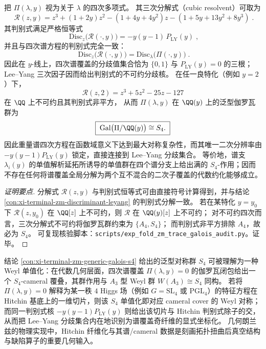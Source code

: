 \begin{conclusion}[谱的最大代数复杂度：\texorpdfstring{$\mathrm{Gal}_{\QQ(y)}\!\bigl(\Pi(\lambda,y)\bigr)\cong S_4$}{Gal(Q(y))(Pi)=S4}]\label{con:xi-terminal-zm-generic-galois-s4}
把 \(\Pi(\lambda,y)\) 视为关于 \(\lambda\) 的四次多项式。
其三次分解式（cubic resolvent）可取为
\[
\boxed{\;
\mathscr R(z,y)
=z^3+(1+2y)z^2-(1+4y+4y^2)z-(1+5y+13y^2+8y^3)\; }.
\]
其判别式满足严格恒等式
\[
\boxed{\;
\mathrm{Disc}_{z}\bigl(\mathscr R(\cdot,y)\bigr)
=-y(y-1)\,P_{\mathrm{LY}}(y)\; } ,
\]
并且与四次谱方程的判别式完全一致：
\[
\boxed{\;
\mathrm{Disc}_{z}\bigl(\mathscr R(\cdot,y)\bigr)
=\mathrm{Disc}_{\lambda}\bigl(\Pi(\cdot,y)\bigr)\; } .
\]
因此在 \(y\)-线上，四次谱覆盖的分歧值集合恰为 \(\{0,1\}\) 与 \(P_{\mathrm{LY}}(y)=0\) 的三根；Lee--Yang 三次因子因而给出判别式的不可约分歧核。
在任一良特化（例如 \(y=2\)）下，
\[
\mathscr R(z,2)=z^{3}+5z^{2}-25z-127
\]
在 \(\QQ\) 上不可约且其判别式非平方，
从而 \(\Pi(\lambda,y)\) 在 \(\QQ(y)\) 上的泛型伽罗瓦群为
\[
\boxed{\;\mathrm{Gal}\bigl(\Pi/\QQ(y)\bigr)\cong S_4.\;}
\]
因此重量谱四次方程在函数域意义下达到最大对称复杂性，而其唯一二次分辨率由 \(-y(y-1)P_{\mathrm{LY}}(y)\) 锁定，直接连接到 Lee--Yang 分歧集合。
等价地，谱支 \(\lambda_i(y)\) 的单值解析延拓所诱导的单值群在四个谱分支上给出满的 \(S_4\)-作用；因而不存在任何将谱覆盖全局分解为两个互不混合的二次子覆盖的代数约化能够成立。
\end{conclusion}
\begin{proof}[证明要点]
分解式 \(\mathscr R(z,y)\) 与判别式恒等式可由直接符号计算得到，并与结论 \ref{con:xi-terminal-zm-discriminant-leyang} 的判别式分解一致。
若在某特化 \(y=y_0\) 下 \(\mathscr R(z,y_0)\) 在 \(\QQ[z]\) 上不可约，则 \(\mathscr R\) 在 \(\QQ(y)[z]\) 上不可约；
对不可约四次而言，三次分解式不可约将伽罗瓦群约束为 \(\{A_4,S_4\}\)；
而判别式非平方排除 \(A_4\)，故必为 \(S_4\)。
可复现核验脚本：\texttt{scripts/exp\_fold\_zm\_trace\_galois\_audit.py}。证毕。
\end{proof}

\begin{remark}[Hitchin 谱覆盖与 \texorpdfstring{$A_3$}{A3} cameral 覆叠：\texorpdfstring{$S_4\simeq W(A_3)$}{S4=W(A3)} 的结构性解释]\label{rem:xi-terminal-zm-hitchin-cameral-cover}
结论 \ref{con:xi-terminal-zm-generic-galois-s4} 给出的泛型对称群 \(S_4\) 可被理解为一种 Weyl 单值化：在代数几何层面，四次谱覆盖 \(\Pi(\lambda,y)=0\) 的伽罗瓦闭包给出一个 \(S_4\)-cameral 覆叠，其群作用与 \(A_3\) 型 Weyl 群 \(W(A_3)\cong S_4\) 同构。
若将 \(\Pi(\lambda,y)=0\) 解释为某一秩 \(4\) Higgs 场（例如 \(G=\mathrm{SL}_4\) 或 \(\mathrm{PGL}_4\)）的特征方程在 Hitchin 基底上的一维切片，则该 \(S_4\) 单值化即对应 cameral cover 的 Weyl 对称；
而同一判别式核 \(-y(y-1)P_{\mathrm{LY}}(y)\) 则给出该切片与 Hitchin 判别式除子的交，从而把 Lee--Yang 分歧集合内在地识别为谱覆盖奇纤维的显式坐标化。
几何朗兰兹的物理实现中，Hitchin 纤维化与其谱/cameral 数据是刻画拓扑扭曲后真空结构与缺陷算子的重要几何输入。\cite{KapustinWitten2006GeometricLanglands}
\end{remark}

